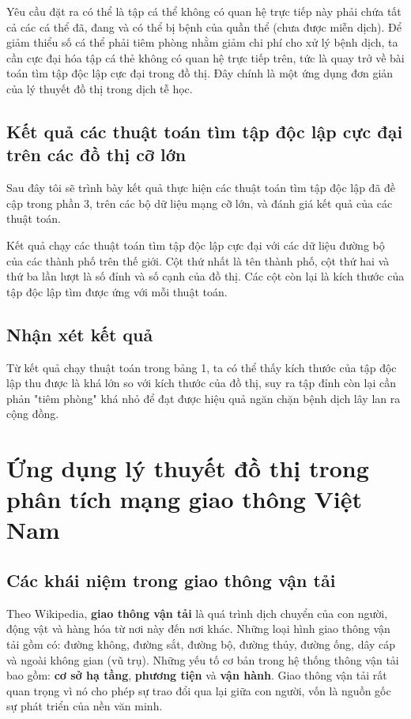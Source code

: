 \documentclass[14pt, oneside, a4paper, openany]{scrartcl}
\begin{document}
Yêu cầu đặt ra có thể là tập cá thể không có quan hệ trực tiếp này phải chứa tất cả các cá thể đã, đang và có thể bị bệnh của quần thể (chưa được miễn dịch). Để giảm thiểu số cá thể phải tiêm phòng nhằm giảm chi phí cho xử lý bệnh dịch, ta cần cực đại hóa tập cá thẻ không có quan hệ trực tiếp trên, tức là quay trở về bài toán tìm tập độc lập cực đại trong đồ thị.
Đây chính là một ứng dụng đơn giản của lý thuyết đồ thị trong dịch tễ học.

\subsection{Kết quả các thuật toán tìm tập độc lập cực đại trên các đồ thị cỡ lớn}
Sau đây tôi sẽ trình bày kết quả thực hiện các thuật toán tìm tập độc lập đã đề cập trong phần 3, trên các bộ dữ liệu mạng cỡ lớn, và đánh giá kết quả của các thuật toán.

\begin{table}[!h]
	\caption[Kết quả chạy các thuật toán tìm tập độc lập cực đại với các dữ liệu đường bộ]{Kết quả chạy các thuật toán tìm tập độc lập cực đại với các dữ liệu đường bộ của các thành phố trên thế giới. Cột thứ nhất là tên thành phố, cột thứ hai và thứ ba lần lượt là số đỉnh và số cạnh của đồ thị. Các cột còn lại là kích thước của tập độc lập tìm được ứng với mỗi thuật toán.}
	\centering
\end{table}

\subsection{Nhận xét kết quả}
Từ kết quả chạy thuật toán trong bảng 1, ta có thể thấy kích thước của tập độc lập thu được là khá lớn so với kích thước của đồ thị, suy ra tập đỉnh còn lại cần phản "tiêm phòng" khá nhỏ để đạt được hiệu quả ngăn chặn bệnh dịch lây lan ra cộng đồng.

\newpage
\section{Ứng dụng lý thuyết đồ thị trong phân tích mạng giao thông Việt Nam}
\subsection{Các khái niệm trong giao thông vận tải}
Theo Wikipedia, \textbf{giao thông vận tải}  là quá trình dịch chuyển của con người, động vật và hàng hóa từ nơi này đến nơi khác. Những loại hình giao thông vận tải gồm có: đường không, đường sắt, đường bộ, đường thủy, đường ống, dây cáp và ngoài không gian (vũ trụ). Những yếu tố cơ bản trong hệ thống thông vận tải bao gồm: \textbf{cơ sở hạ tầng}, \textbf{phương tiện} và \textbf{vận hành}. Giao thông vận tải rất quan trọng vì nó cho phép sự trao đổi qua lại giữa con người, vốn là nguồn gốc sự phát triển của nền văn minh.
\end{document}
